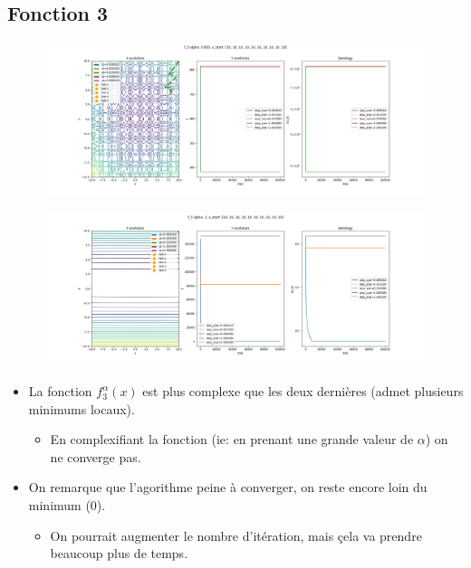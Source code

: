 \documentclass[twoside,10pt,a4paper]{article}
\numberwithin{equation}{section}					%
\numberwithin{figure}{section}						%
\begin{document}
\subsection{Fonction 3 }\label{sec:subsection2}
\begin{figure}[H]
    \centering
    \includegraphics[width=\textwidth]{imgs/fixed_sz/f_3_a-0.005_fixed_sz.png}
    \caption{}
\end{figure}
\begin{figure}[H]
    \centering
    \includegraphics[width=\textwidth]{imgs/fixed_sz/f_3_a-3_fixed_sz.png}
    \caption{}
\end{figure}
\begin{itemize}
	\item La fonction $f_3^{\alpha}(x)$ est plus complexe que les deux dernières (admet plusieurs minimums locaux).
	\begin{itemize}
    	\item En complexifiant la fonction (ie: en prenant une grande valeur de $\alpha$) on ne converge pas.
	\end{itemize}
	\item On remarque que l'agorithme peine à converger, on reste encore loin du minimum (0).
	\begin{itemize}
    	\item On pourrait augmenter le nombre d'itération, mais çela va prendre beaucoup plus de temps.
	\end{itemize}
\end{itemize}
\end{document}
